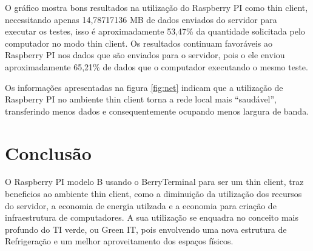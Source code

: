 \documentclass[
	12pt,				%
	openright,			%
	twoside,			%
	a4paper,			%
	chapter=TITLE,		%
	english,			%
	brazil				%
	]{abntex2}
\begin{document}
O gráfico mostra bons resultados na utilização do Raspberry PI como thin client, necessitando apenas 14,78717136 MB de dados enviados  do servidor para executar os testes, isso é aproximadamente 53,47\% da quantidade solicitada pelo computador no modo thin client. Os resultados continuam favoráveis ao Raspberry PI nos dados que são enviados para o servidor, pois o ele enviou aproximadamente 65,21\% de dados que o computador executando o mesmo teste.

Os informações apresentadas na figura \ref{fig:net} indicam que a utilização de Raspberry PI no ambiente thin client torna a rede local mais “saudável”, transferindo menos dados e consequentemente ocupando menos largura de banda. 









\part{Conclusão}

O Raspberry PI modelo B usando o BerryTerminal para ser um thin client, traz beneficios ao ambiente thin client, como a diminuição da utilização dos recursos do servidor, a economia de energia utilzada e a economia para criação de infraestrutura de computadores. A sua utilização se enquadra no conceito mais profundo do TI verde, ou Green IT, pois envolvendo uma nova estrutura de Refrigeração e um melhor aproveitamento dos espaços físicos. 
\end{document}
